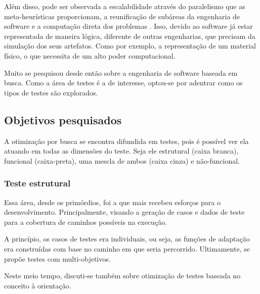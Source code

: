 Além disso, pode ser observada a escalabilidade através do paralelismo que as
meta-heurísticas proporcionam, a reunificação de subáreas da engenharia de
software e a computação direta dos problemas \cite{harman2012search}. Isso,
devido ao software já estar representada de maneira lógica, diferente de outras
engenharias, que precisam da simulação dos seus artefatos. Como por exemplo, a
representação de um material físico, o que necessita de um alto poder
computacional.

Muito se pesquisou desde então sobre a engenharia de software baseada em busca.
Como a área de testes é a de interesse, optou-se por adentrar como os tipos de
testes são explorados.

\subsection{Objetivos pesquisados}

A otimização por busca se encontra difundida em testes, pois é possível ver ela
atuando em todas as dimensões do teste. Seja ele estrutural (caixa branca),
funcional (caixa-preta), uma mescla de ambos (caixa cinza) e não-funcional.

\subsubsection{Teste estrutural}

Essa área, desde os primórdios, foi a que mais recebeu esforços para o
desenvolvimento. Principalmente, visando a geração de casos e dados de teste
para a cobertura de caminhos possíveis na execução. 

A princípio, os casos de testes era individuais, ou seja, as funções de
adaptação era construídas com base no caminho em que seria percorrido.
Ultimamente, se propõe testes com multi-objetivos. 

Neste meio tempo, discuti-se também sobre otimização de testes baseada no
conceito à orientação. 









